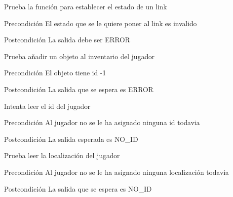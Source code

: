 \begin{DoxyRefList}
\item[\label{test__test000143}%
\hypertarget{test__test000143}{}%
Global \hyperlink{link__test_8c_a4af28f4401af2552f9b331a6ea3762e4}{test3\-\_\-link\-\_\-set\-\_\-state} ()]Prueba la función para establecer el estado de un link \begin{DoxyPrecond}{Precondición}
El estado que se le quiere poner al link es invalido 
\end{DoxyPrecond}
\begin{DoxyPostcond}{Postcondición}
La salida debe ser E\-R\-R\-O\-R  
\end{DoxyPostcond}

\item[\label{test__test000224}%
\hypertarget{test__test000224}{}%
Global \hyperlink{player__test_8c_ac984e5292c95002644a7af4fa499d0fb}{test3\-\_\-player\-\_\-add\-\_\-object} ()]Prueba añadir un objeto al inventario del jugador \begin{DoxyPrecond}{Precondición}
El objeto tiene id -\/1 
\end{DoxyPrecond}
\begin{DoxyPostcond}{Postcondición}
La salida que se espera es E\-R\-R\-O\-R  
\end{DoxyPostcond}

\item[\label{test__test000215}%
\hypertarget{test__test000215}{}%
Global \hyperlink{player__test_8c_a7c658b9c2f29b7a96c009c059e2884bf}{test3\-\_\-player\-\_\-get\-\_\-id} ()]Intenta leer el id del jugador \begin{DoxyPrecond}{Precondición}
Al jugador no se le ha asignado ninguna id todavia 
\end{DoxyPrecond}
\begin{DoxyPostcond}{Postcondición}
La salida esperada es N\-O\-\_\-\-I\-D  
\end{DoxyPostcond}

\item[\label{test__test000221}%
\hypertarget{test__test000221}{}%
Global \hyperlink{player__test_8c_ac8251a4a8b1f1136da60fbddd03a3526}{test3\-\_\-player\-\_\-get\-\_\-location} ()]Prueba leer la localización del jugador \begin{DoxyPrecond}{Precondición}
Al jugador no se le ha asignado ninguna localización todavía 
\end{DoxyPrecond}
\begin{DoxyPostcond}{Postcondición}
La salida que se espera es N\-O\-\_\-\-I\-D  
\end{DoxyPostcond}


\end{DoxyRefList}
